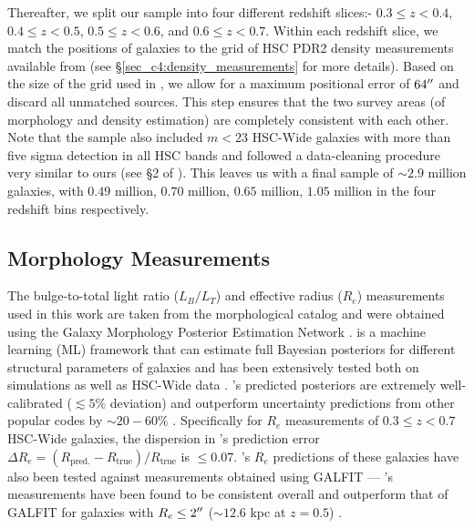 Thereafter, we split our sample into four different redshift slices:- $0.3 \leq z < 0.4$, $0.4 \leq z < 0.5$, $0.5 \leq z < 0.6$, and $0.6 \leq z < 0.7$. Within each redshift slice, we match the positions of galaxies to the grid of HSC PDR2 density measurements available from \citet{hsc_den} (see \S \ref{sec_c4:density_measurements} for more details). Based on the size of the grid used in \citet{hsc_den}, we allow for a maximum positional error of $64\mbox{$^{\prime\prime}$}$ and discard all unmatched sources. This step ensures that the two survey areas (of morphology and density estimation) are completely consistent with each other. Note that the \citet{hsc_den} sample also included $m < 23$ HSC-Wide galaxies with more than five sigma detection in all HSC bands and followed a data-cleaning procedure very similar to ours (see \S 2 of \citet{hsc_den}). This leaves us with a final sample of $\sim2.9$ million galaxies, with $0.49$ million, $0.70$ million, $0.65$ million, $1.05$ million in the four redshift bins respectively. 

\subsection{Morphology Measurements} \label{sec_c4:morph_measurements}
The bulge-to-total light ratio ($L_B/L_T$) and effective radius ($R_e$) measurements used in this work are taken from the \citet{hsc_wide_morphs} morphological catalog and were obtained using the Galaxy Morphology Posterior Estimation Network \citep[\gampen{};][]{gampen_software_paper}. \gampen{} is a machine learning (ML) framework that can estimate full Bayesian posteriors for different structural parameters of galaxies and has been extensively tested both on simulations as well as HSC-Wide data \citep{gampen_software_paper,hsc_wide_morphs}. \gampen{}'s predicted posteriors are extremely well-calibrated ($\lesssim 5\%$ deviation) and outperform uncertainty predictions from other popular codes by $\sim20-60\%$ \citep[Figure 21 of ][]{hsc_wide_morphs}. Specifically for $R_e$ measurements of $0.3 \leq z <0.7$ HSC-Wide galaxies, the dispersion in \gampen{}'s prediction error $\Delta R_e=\left(R_{\text {pred.}}-R_{\text {true}}\right) /R_{\text {true}}$ is $\leq0.07$. \gampen{}'s $R_e$ predictions of these galaxies have also been tested against measurements obtained using GALFIT --- \gampen{}'s measurements have been found to be consistent overall and outperform that of GALFIT for galaxies with $R_e \leq 2\mbox{$^{\prime\prime}$}$ ($\sim 12.6$ kpc at $z=0.5$) \citep[Figure 31 of ][]{hsc_wide_morphs}.

